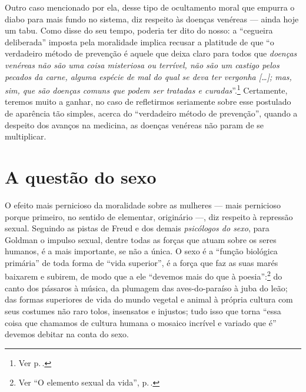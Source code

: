 Outro caso mencionado por ela, desse
tipo de ocultamento moral que empurra o diabo para mais fundo no
sistema, diz respeito às doenças venéreas --- ainda hoje um tabu. Como
disse do seu tempo, poderia ter dito do nosso: a ``cegueira deliberada''
imposta pela moralidade implica recusar a platitude de que ``o
verdadeiro método de prevenção é aquele que deixa claro para todos que
\textit{doenças venéreas não são uma coisa misteriosa ou terrível, não são um
castigo pelos pecados da carne, alguma espécie de mal do qual se deva
ter vergonha {[}\ldots{]}; mas, sim, que são doenças comuns que podem ser
tratadas e curadas}''.\footnote{Ver p.\,\pageref{std}.} Certamente, teremos muito a ganhar, no caso de refletirmos seriamente sobre esse postulado de aparência tão simples,
acerca do ``verdadeiro método de prevenção'', quando a despeito dos
avanços na medicina, as doenças venéreas não param de se multiplicar.

\section{A questão do sexo}

O efeito mais pernicioso da moralidade sobre as mulheres --- mais
pernicioso porque primeiro, no sentido de elementar, originário ---, diz
respeito à repressão sexual. Seguindo as pistas de Freud e dos demais
\textit{psicólogos do sexo}, para Goldman o impulso sexual, dentre todas as forças que atuam
sobre os seres humanos, é a mais importante, se não a única.
O sexo é a ``função biológica primária'' de toda forma de ``vida superior'', é a
força que faz as suas marés baixarem e subirem, de modo que a ele
``devemos mais do que à poesia'':\footnote{Ver ``O elemento sexual da vida'', p.\,\pageref{sexual}.} do canto dos pássaros à música, da
plumagem das aves-do-paraíso à juba do leão; das formas superiores de
vida do mundo vegetal e animal à própria cultura com seus costumes não
raro tolos, insensatos e injustos; tudo isso que torna
``essa coisa que chamamos de cultura humana o mosaico incrível e variado
que é'' devemos debitar na conta do sexo.

